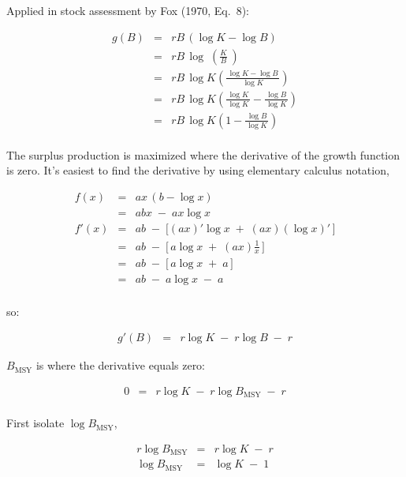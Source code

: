\documentclass[fleqn]{article}
\newcommand{\msy}{_\mathrm{MSY}}
\begin{document}
Applied in stock assessment by Fox (1970, Eq.~8):

\begin{eqnarray*}
  g(B) &=& rB\,(\log K\!-\!\log B)                                      \\[1em]
  ~    &=& rB\,\log\;\!\!\!\left(\!\frac{K}{B}\:\!\!\right)             \\[1em]
  ~    &=& rB\,\log K\!\left(\frac{\,\log K\!-\!\log B\,}{\log K}\right)\\[1em]
  ~    &=& rB\,\log K\!
  \left(\frac{\,\log K\,}{\log K}-\frac{\,\log B\,}{\log K}\right)      \\[1em]
  ~    &=& rB\,\log K\!\left(1-\frac{\,\log B\,}{\log K}\right)         \\[1em]
\end{eqnarray*}

The surplus production is maximized where the derivative of the growth function
is zero. It's easiest to find the derivative by using elementary calculus
notation,

\begin{eqnarray*}
  f(x)  &=& ax\,(b\!-\!\log x)                                  \\[1em]
  ~     &=& abx \;-\; ax\log x                                  \\[1em]
  f'(x) &=& ab \;-\; \Big[(ax)'\log x \;+\; (ax)(\log x)'\,\Big]\\[1em]
  ~     &=& ab \;-\; \Big[\,a\log x \;+\; (ax)\frac{1}{x}\,\Big]\\[1em]
  ~     &=& ab \;-\; \Big[\,a\log x \;+\; a\,\Big]              \\[1em]
  ~     &=& ab \;-\; a\log x \;-\; a                            \\[1ex]
\end{eqnarray*}

so:

\begin{eqnarray*}
  g'(B) &=& r\log K \;-\; r\log B \;-\; r
\end{eqnarray*}

\newpage

$B\msy$ is where the derivative equals zero:

\begin{eqnarray*}
  0 &=& r\log K \;-\; r\log B\msy \;-\; r\\[1ex]
\end{eqnarray*}

First isolate $\log B\msy$,

\begin{eqnarray*}
  r\log B\msy &=& r\log K \;-\; r\\[1em]
  \log B\msy &=& \log K \;-\; 1  \\[1ex]
\end{eqnarray*}
\end{document}
